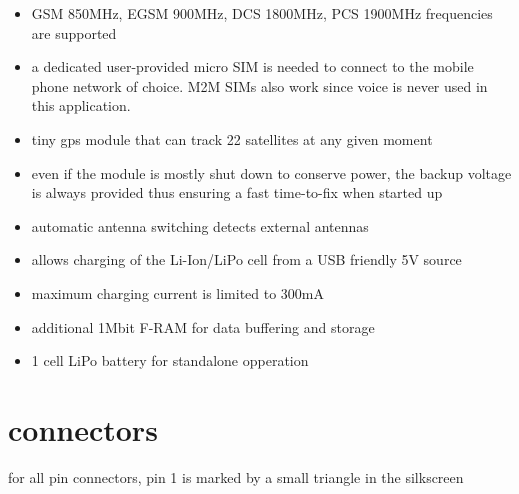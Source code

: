 \documentclass[a4paper,twoside]{refart}
\begin{document}
    \begin{itemize}
        \item GSM 850MHz, EGSM 900MHz, DCS 1800MHz, PCS 1900MHz frequencies are supported
        \item a dedicated user-provided micro SIM is needed to connect to the mobile phone network of choice. M2M SIMs also work since voice is never used in this application.
    \end{itemize}

    \begin{itemize}
        \item tiny gps module that can track 22 satellites at any given moment
        \item even if the module is mostly shut down to conserve power, the backup voltage is always provided thus ensuring a fast time-to-fix when started up
        \item automatic antenna switching detects external antennas
    \end{itemize}
    \begin{itemize}
        \item allows charging of the Li-Ion/LiPo cell from a USB friendly 5V source
        \item maximum charging current is limited to 300mA
    \end{itemize}
    \begin{itemize}
        \item additional 1Mbit F-RAM for data buffering and storage
    \end{itemize}
    \begin{itemize}
        \item 1 cell LiPo battery for standalone opperation
    \end{itemize}

\newpage

\section{connectors}
for all pin connectors, pin 1 is marked by a small triangle in the silkscreen
\end{document}
